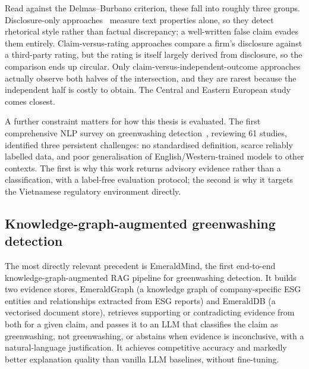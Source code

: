 \documentclass[fontsize=12pt,oneside,headings=small]{scrreprt}
\begin{document}
Read against the Delmas--Burbano criterion, these fall into roughly three groups. Disclosure-only approaches~\cite{gorovaia2025identifying,bingler2022cheap} measure text properties alone, so they detect rhetorical style rather than factual discrepancy; a well-written false claim evades them entirely. Claim-versus-rating approaches compare a firm's disclosure against a third-party rating, but the rating is itself largely derived from disclosure, so the comparison ends up circular. Only claim-versus-independent-outcome approaches actually observe both halves of the intersection, and they are rarest because the independent half is costly to obtain. The Central and Eastern European study~\cite{davidescu2026detecting} comes closest.

A further constraint matters for how this thesis is evaluated. The first comprehensive NLP survey on greenwashing detection~\cite{calamai2025detecting}, reviewing 61 studies, identified three persistent challenges: no standardised definition, scarce reliably labelled data, and poor generalisation of English/Western-trained models to other contexts. The first is why this work returns advisory evidence rather than a classification, with a label-free evaluation protocol; the second is why it targets the Vietnamese regulatory environment directly.

\subsection{Knowledge-graph-augmented greenwashing detection}

The most directly relevant precedent is EmeraldMind, the first end-to-end knowledge-graph-augmented RAG pipeline for greenwashing detection. It builds two evidence stores, EmeraldGraph (a knowledge graph of company-specific ESG entities and relationships extracted from ESG reports) and EmeraldDB (a vectorised document store), retrieves supporting or contradicting evidence from both for a given claim, and passes it to an LLM that classifies the claim as greenwashing, not greenwashing, or abstains when evidence is inconclusive, with a natural-language justification. It achieves competitive accuracy and markedly better explanation quality than vanilla LLM baselines, without fine-tuning.
\end{document}
